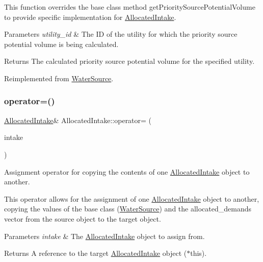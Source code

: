 This function overrides the base class method {\ttfamily get\+Priority\+Source\+Potential\+Volume} to provide specific implementation for {\ttfamily \mbox{\hyperlink{classAllocatedIntake}{Allocated\+Intake}}}.


\begin{DoxyParams}{Parameters}
{\em utility\+\_\+id} & The ID of the utility for which the priority source potential volume is being calculated.\\
\hline
\end{DoxyParams}
\begin{DoxyReturn}{Returns}
The calculated priority source potential volume for the specified utility. 
\end{DoxyReturn}


Reimplemented from \mbox{\hyperlink{classWaterSource_a00a432eba75eaae7195338a8514ac853}{Water\+Source}}.

\mbox{\label{classAllocatedIntake_a86afa1536bf7ee7945f2c567c43ffb6b}} 
\subsubsection{\texorpdfstring{operator=()}{operator=()}}
{\footnotesize\ttfamily \mbox{\hyperlink{classAllocatedIntake}{Allocated\+Intake}}\& Allocated\+Intake\+::operator= (\begin{DoxyParamCaption}\item[{const \mbox{\hyperlink{classAllocatedIntake}{Allocated\+Intake}} \&}]{intake }\end{DoxyParamCaption})}



Assignment operator for copying the contents of one {\ttfamily \mbox{\hyperlink{classAllocatedIntake}{Allocated\+Intake}}} object to another. 

This operator allows for the assignment of one {\ttfamily \mbox{\hyperlink{classAllocatedIntake}{Allocated\+Intake}}} object to another, copying the values of the base class ({\ttfamily \mbox{\hyperlink{classWaterSource}{Water\+Source}}}) and the {\ttfamily allocated\+\_\+demands} vector from the source object to the target object.


\begin{DoxyParams}{Parameters}
{\em intake} & The {\ttfamily \mbox{\hyperlink{classAllocatedIntake}{Allocated\+Intake}}} object to assign from.\\
\hline
\end{DoxyParams}
\begin{DoxyReturn}{Returns}
A reference to the target {\ttfamily \mbox{\hyperlink{classAllocatedIntake}{Allocated\+Intake}}} object ({\ttfamily $\ast$this}). 
\end{DoxyReturn}
\mbox{\label{classAllocatedIntake_afc73ae38f23417cfbece54c4c3d4ccc9}} 
